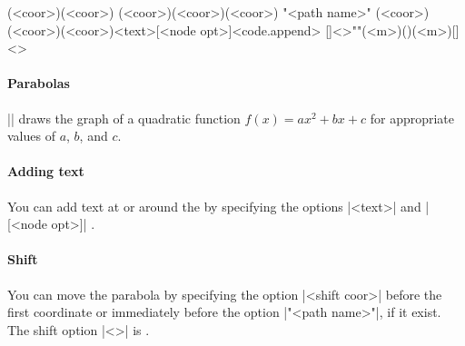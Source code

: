 \begin{tzdef}
\tzparabola(<coor>)(<coor>)
\tzparabola(<coor>)(<coor>)(<coor>)
"<path name>"
           (<coor>)(<coor>)(<coor>){<text>}[<node opt>]<code.append>
  []<>""(<m>)()(<m>){}[]<>
\end{tzdef}

\paragraph{Parabolas}
|\tzplot| draws the graph of a quadratic function $f(x)=ax^2+bx+c$ for appropriate values of $a$, $b$, and $c$.

\begin{tzcode}{.3}
\end{tzcode}

\begin{tzcode}{.3}
\end{tzcode}

\paragraph{Adding text}
You can add text at or around the  by specifying the options |{<text>}| and |[<node opt>]| .

\begin{tzcode}{.3}
\end{tzcode}

\paragraph{Shift}
You can move the parabola by specifying the option |<shift coor>| before the first coordinate or immediately before the option |"<path name>"|, if it exist.
The  shift option |<>| is .

